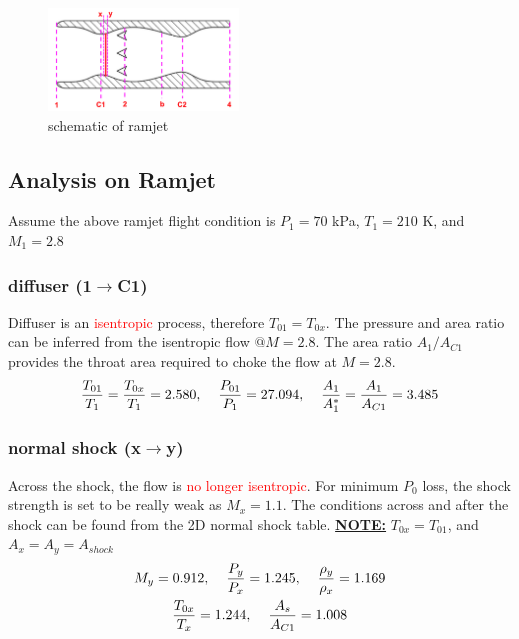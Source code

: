\documentclass[a4paper,10pt]{article}
\begin{document}
\begin{figure}[H]
    \centering
    \includegraphics[width=0.45\textwidth]{Figure/ram.png}
    \caption{schematic of ramjet} 
\end{figure}

\subsection{Analysis on Ramjet}
Assume the above ramjet flight condition is $P_1 = 70$ kPa, $T_1=210$ K, and $M_1 = 2.8$

\subsubsection{diffuser (1$\rightarrow$C1)}
Diffuser is an \textcolor{red}{isentropic} process, therefore $T_{01}=T_{0x}$. The pressure and area ratio can be inferred from the isentropic flow $@M=2.8$. The area ratio $A_1/A_{C1}$ provides the throat area required to choke the flow at $M=2.8$.
\begin{gather*}
    \frac{T_{01}}{T_1}=\frac{T_{0x}}{T_1}=2.580,\hspace*{0.4cm}\frac{P_{01}}{P_1}=27.094,\hspace*{0.4cm}\frac{A_1}{A_1^*} = \frac{A_1}{A_{C1}} = 3.485
\end{gather*}

\vspace*{-0.3cm}
\subsubsection{normal shock (x$\rightarrow$y)}
Across the shock, the flow is \textcolor{red}{no longer isentropic}. For minimum $P_0$ loss, the shock strength is set to be really weak as $M_x = 1.1$. The conditions across and after the shock can be found from the 2D normal shock table. \underline{\textbf{NOTE:}} $T_{0x}=T_{01}$, and $A_x = A_y = A_{shock}$
\begin{gather*}
    M_y = 0.912, \hspace*{0.4cm}\frac{P_y}{P_x}=1.245,\hspace*{0.4cm}\frac{\rho_y}{\rho_x}=1.169\\
    \frac{T_{0x}}{T_x} = 1.244,\hspace*{0.4cm}\frac{A_s}{A_{C1}} = 1.008
\end{gather*}
\end{document}

